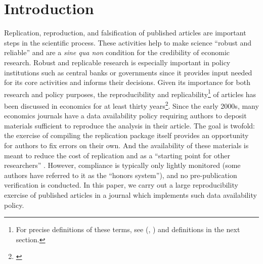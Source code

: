 \documentclass{cje} %
\theoremstyle{plain}%
\theoremstyle{definition}
\theoremstyle{remark}
\begin{document}
  
\maketitle

\section{Introduction}\label{sec:intro}
Replication, reproduction, and falsification of published articles are important steps in the scientific process. These activities help to make science ``robust and reliable'' \citep{Bollen2015-vb} and are a \textit{sine qua non} condition for the credibility of economic research. Robust and replicable research is especially important in policy institutions such as central banks or governments since it provides input needed for its core activities and informs their decisions. Given its importance for both research and policy purposes, the reproducibility and replicability\footnote{For precise definitions of these terms, see (\cite{Bollen2015-vb}, \cite{nasem2019}) and definitions in the next section.} of articles has been discussed in economics for at least thirty years\footnote{\citep{Dewald1986,Vinod2005,AndersonEtAl2005,King95,BurmanEtAl2010,Duvendack2017,Hamermesh2017,Sukhtankar2017,Hoeffler2017,Coffman2017,Chang2017,Berry2017,Anderson2017}}. Since the early 2000s, many economics journals have a data availability policy requiring authors to deposit materials sufficient to reproduce the analysis in their article. The goal is twofold: the exercise of compiling the replication package itself provides an opportunity for authors to fix errors on their own. And the availability of these materials is meant to reduce the cost of replication and as a ``starting point for other researchers'' \citep{bernanke2004}. However, compliance is typically only lightly monitored (some authors have referred to it as the ``honors system''), and no pre-publication verification is conducted. In this paper, we carry out a large reproducibility exercise of published articles in a journal which implements such data availability policy.
\end{document}
